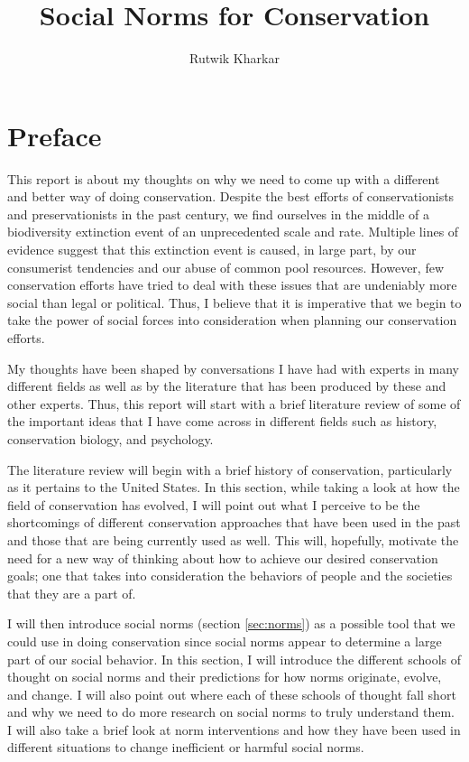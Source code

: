 \documentclass{report}
\title{Social Norms for Conservation}
\author{Rutwik Kharkar}
\begin{document}
\maketitle

\chapter*{Preface}

This report is about my thoughts on why we need to come up with a different and better way of doing conservation. Despite the best efforts of conservationists and preservationists in the past century, we find ourselves in the middle of a biodiversity extinction event of an unprecedented scale and rate. Multiple lines of evidence suggest that this extinction event is caused, in large part, by our consumerist tendencies and our abuse of common pool resources. However, few conservation efforts have tried to deal with these issues that are undeniably more social than legal or political. Thus, I believe that it is imperative that we begin to take the power of social forces into consideration when planning our conservation efforts.

My thoughts have been shaped by conversations I have had with experts in many different fields as well as by the literature that has been produced by these and other experts. Thus, this report will start with a brief literature review of some of the important ideas that I have come across in different fields such as history, conservation biology, and psychology.

The literature review will begin with a brief history of conservation, particularly as it pertains to the United States. In this section, while taking a look at how the field of conservation has evolved, I will point out what I perceive to be the shortcomings of different conservation approaches that have been used in the past and those that are being currently used as well. This will, hopefully, motivate the need for a new way of thinking about how to achieve our desired conservation goals; one that takes into consideration the behaviors of people and the societies that they are a part of.

I will then introduce social norms (section \ref{sec:norms}) as a possible tool that we could use in doing conservation since social norms appear to determine a large part of our social behavior. In this section, I will introduce the different schools of thought on social norms and their predictions for how norms originate, evolve, and change. I will also point out where each of these schools of thought fall short and why we need to do more research on social norms to truly understand them. I will also take a brief look at norm interventions and how they have been used in different situations to change inefficient or harmful social norms.
\end{document}
